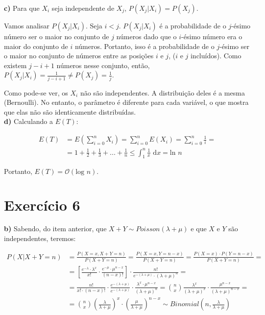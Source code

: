 \documentclass[12pt,letterpaper]{article}
\begin{document}
	\textbf{c)} Para que $X_i$ seja independente de $X_j$, $P(X_j | X_i) = P(X_j)$.
	
	Vamos analisar $P(X_j | X_i)$. Seja $i < j$. $P(X_j | X_i)$ é a probabilidade de o $j$-ésimo número ser o maior no conjunto de $j$ números dado que o $i$-ésimo número era o maior do conjunto de $i$ números. Portanto, isso é a probabilidade de o $j$-ésimo ser o maior no conjunto de números entre as posições $i$ e $j$, ($i$ e $j$ incluídos). Como existem $j-i+1$ números nesse conjunto, então, $P(X_j | X_i) = \frac{1}{j-i+1} \neq P(X_j) = \frac{1}{j}$. 
	
	Como pode-se ver, os $X_i$ não são independentes. A distribuição deles é a mesma (Bernoulli). No entanto, o parâmetro é diferente para cada variável, o que mostra que elas não são identicamente distribuídas. \\
	
	\textbf{d)} Calculando a $E(T)$:
	
	\begin{equation*}
		\begin{split}
		E(T) & = E\left(\sum_{i=0}^{n} X_i\right) = \sum_{i=0}^{n} E(X_i) = \sum_{i=0}^{n} \frac{1}{i} = \\
		& = 1 + \frac{1}{2} + \frac{1}{3} + ... + \frac{1}{n} \leq \int_{1}^{n} \frac{1}{x} \text{ d}x = \text{ln } n
		\end{split}
	\end{equation*}
	
	Portanto, $E(T) = \mathcal{O}(\text{log } n)$.
	
	\section*{Exercício 6}
	
	\textbf{b)} Sabendo, do item anterior, que $X+Y \sim Poisson(\lambda + \mu)$ e que $X$ e $Y$ são independentes, teremos: 
	
	\begin{equation*}
		\begin{split}
			P(X|X+Y=n) & = \frac{P(X=x, X+Y=n)}{P(X+Y=n)} = \frac{P(X=x, Y=n-x)}{P(X+Y=n)} = \frac{P(X=x) \cdot P(Y=n-x)}{P(X+Y=n)} =\\
			& = \left[\frac{e^{-\lambda} \cdot \lambda^x}{x!} \cdot \frac{e^{-\mu} \cdot \mu^{n-x}}{(n-x)!}\right] \cdot \frac{n!}{e^{-(\lambda+\mu)}\cdot(\lambda+\mu)^n} = \\
			& = \frac{n!}{x!\cdot(n-x)!} \cdot \frac{e^{-(\lambda+\mu)}}{e^{-(\lambda+\mu)}} \cdot \frac{\lambda^x \cdot \mu^{n-x}}{(\lambda+\mu)^n} = \binom{n}{x} \frac{\lambda^x}{(\lambda+\mu)^x} \cdot \frac{\mu^{n-x}}{(\lambda+\mu)^{n-x}} = \\
			& = \binom{n}{x} \left(\frac{\lambda}{\lambda+\mu}\right)^x \cdot \left(\frac{\mu}{\lambda+\mu}\right)^{n-x} \sim Binomial\left(n, \frac{\lambda}{\lambda+\mu}\right)\\
		\end{split}
	\end{equation*}
	
\end{document}
